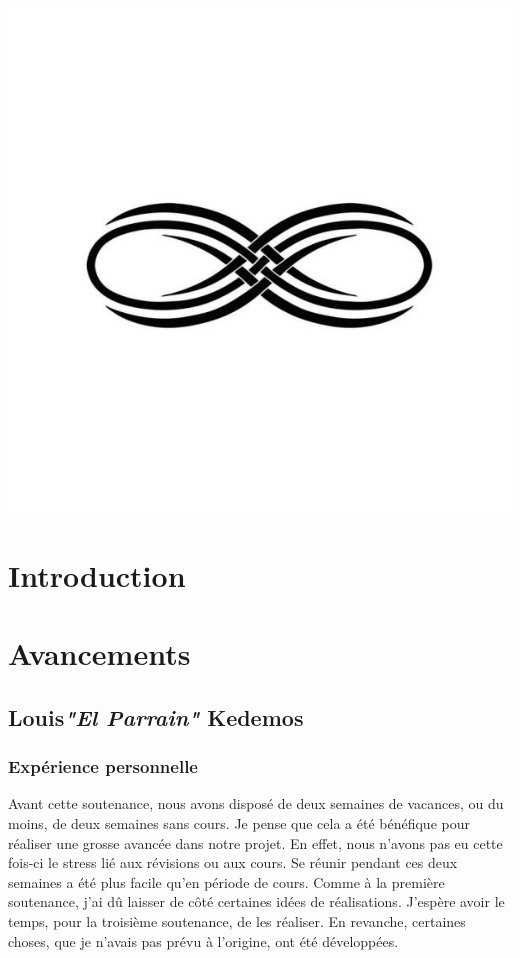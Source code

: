 \documentclass{article}
\begin{document}
\begin{center}
\includegraphics[scale=00.20]{infini}
\end{center}

\newpage
\thispagestyle{empty}
\tableofcontents

\newpage
\fontsize{12}{12}
\section{Introduction}

\newpage

\section{Avancements}
\subsection{Louis\textcolor{pseudoblue}{\textit{"El Parrain"}} Kedemos}

\subsubsection{Expérience personnelle}
Avant cette soutenance, nous avons disposé de deux semaines de vacances, ou du moins, de deux semaines sans cours. Je pense que cela a été bénéfique pour réaliser une grosse avancée dans notre projet. En effet, nous n'avons pas eu cette fois-ci le stress lié aux révisions ou aux cours. Se réunir pendant ces deux semaines a été plus facile qu'en période de cours. \newline
Comme à la première soutenance, j'ai dû laisser de côté certaines idées de réalisations. J'espère avoir le temps, pour la troisième soutenance, de les réaliser. En revanche, certaines choses, que je n'avais pas prévu à l'origine, ont été développées.
\end{document}
